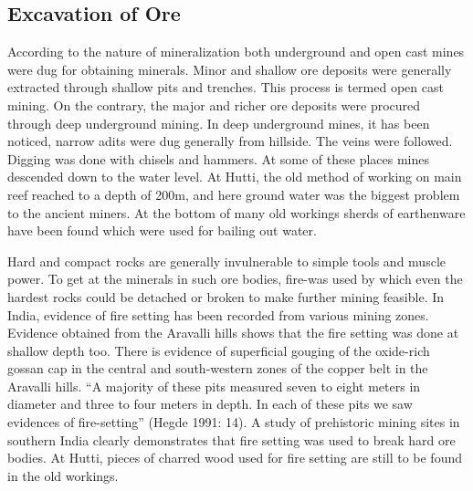 \vspace{-.3cm}

\subsection*{Excavation of Ore}

\vspace{-.2cm}

According to the nature of mineralization both underground and open cast mines were dug for obtaining minerals. Minor and shallow ore deposits were generally extracted through shallow pits and trenches. This process is termed open cast mining. On the contrary, the major and richer ore deposits were procured through deep underground mining. In deep underground mines, it has been noticed, narrow adits were dug generally from hillside. The veins were followed. Digging was done with chisels and hammers. At some of these places mines descended down to the water level.  At Hutti, the old method of working on main reef reached to a depth of 200m, and here ground water was the biggest problem to the ancient miners. At the bottom of many old workings sherds of earthenware have been found which were used for bailing out water. 


Hard and compact rocks are generally invulnerable to simple tools and muscle power. To get at the minerals in such ore bodies, fire-was used by which even the hardest rocks could be detached or broken to make further mining feasible. In India, evidence of fire setting has been recorded from various mining zones. Evidence obtained from the Aravalli hills shows that the fire setting was done at shallow depth too. There is evidence of superficial gouging of the oxide-rich gossan cap in the central and south-western zones of the copper belt in the Aravalli hills. “A majority of these pits measured seven to eight meters in diameter and three to four meters in depth. In each of these pits we saw evidences of fire-setting” (Hegde 1991: 14). A study of prehistoric mining sites in southern India clearly demonstrates that fire setting was used to break hard ore bodies. At Hutti, pieces of charred wood used for fire setting are still to be found in the old workings. 

